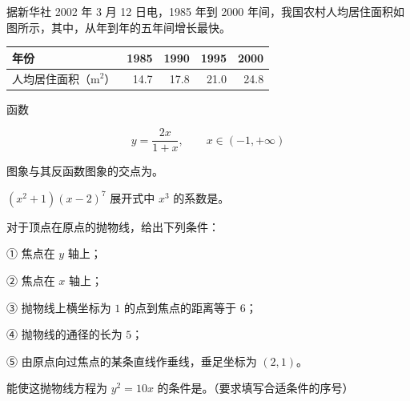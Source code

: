 \Needspace{0.4\textheight}
\begin{question}
据新华社 2002 年 3 月 12 日电，1985 年到 2000 年间，我国农村人均居住面积如图所示，其中，从\gkblank{}年到\gkblank{}年的五年间增长最快。
\nopagebreak[4]
\begin{center}\end{center}
\nopagebreak[4]
\begin{center}
\begin{tabular}{lrrrr}
\toprule
年份 & 1985 & 1990 & 1995 & 2000 \\
\midrule
人均居住面积（$\mathrm{m^2}$） & 14.7 & 17.8 & 21.0 & 24.8 \\
\bottomrule
\end{tabular}
\end{center}

\end{question}
\begin{question}
函数

\nopagebreak[4]
\[
y=\frac{2x}{1+x},\qquad x\in(-1,+\infty)
\]

图象与其反函数图象的交点为\gkblank{}。

\end{question}
\begin{question}
$(x^2+1)(x-2)^7$ 展开式中 $x^3$ 的系数是\gkblank{}。

\end{question}
\begin{question}
对于顶点在原点的抛物线，给出下列条件：

① 焦点在 $y$ 轴上；

② 焦点在 $x$ 轴上；

③ 抛物线上横坐标为 $1$ 的点到焦点的距离等于 $6$；

④ 抛物线的通径的长为 $5$；

⑤ 由原点向过焦点的某条直线作垂线，垂足坐标为 $(2,1)$。

能使这抛物线方程为 $y^2=10x$ 的条件是\gkblank{}。（要求填写合适条件的序号）

\end{question}

